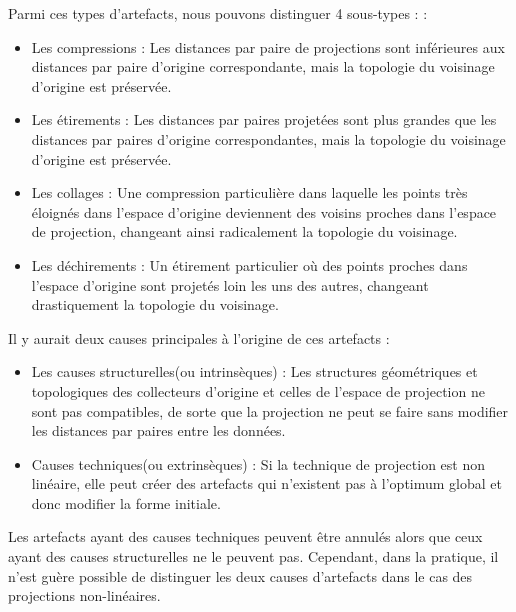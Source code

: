 Parmi ces types d'artefacts, nous pouvons distinguer 4 sous-types :\cite{aupetit2007visualizing} :

\begin{itemize}
    \item Les compressions : Les distances par paire de projections sont inférieures aux distances par paire d'origine correspondante, mais la topologie du voisinage d'origine est préservée.
    \item Les étirements : Les distances par paires projetées sont plus grandes que les distances par paires d'origine correspondantes, mais la topologie du voisinage d'origine est préservée.
    \item Les collages :  Une compression particulière dans laquelle les points très éloignés dans l'espace d'origine deviennent des voisins proches dans l'espace de projection, changeant ainsi radicalement la topologie du voisinage.
    \item Les déchirements : Un étirement particulier où des points proches dans l'espace d'origine sont projetés loin les uns des autres, changeant drastiquement la topologie du voisinage.
\end{itemize}

Il y aurait deux causes principales à l'origine de ces artefacts \cite{aupetit2007visualizing} : 
\begin{itemize}
    \item Les causes structurelles(ou intrinsèques) : Les structures géométriques et topologiques des collecteurs d'origine et celles de l'espace de projection ne sont pas compatibles, de sorte que la projection ne peut se faire sans modifier les distances par paires entre les données.
    \item Causes techniques(ou extrinsèques) : Si la technique de projection est non linéaire, elle peut créer des artefacts qui n'existent pas à l'optimum global et donc modifier la forme initiale.
\end{itemize}

Les artefacts ayant des causes techniques peuvent être annulés alors que ceux ayant des causes structurelles ne le peuvent pas. Cependant, dans la pratique, il n'est guère possible de distinguer les deux causes d'artefacts dans le cas des projections non-linéaires.


